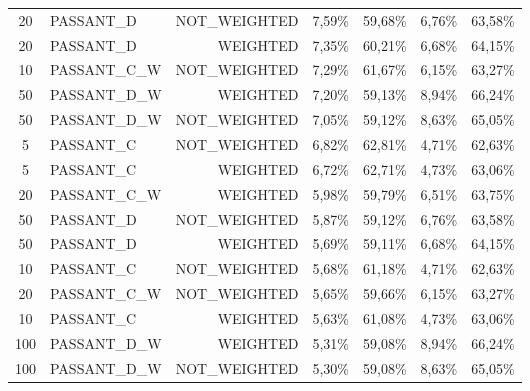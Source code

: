 \begin{table}[H]
{\begin{tabular}{ c l r c c c c }
			20 &  PASSANT\_D & NOT\_WEIGHTED &     7,59\% &    59,68\% &     6,76\% &    63,58\% \\
			
			20 &  PASSANT\_D &   WEIGHTED &     7,35\% &    60,21\% &     6,68\% &    64,15\% \\
			
			10 & PASSANT\_C\_W & NOT\_WEIGHTED &     7,29\% &    61,67\% &     6,15\% &    63,27\% \\
			
			50 & PASSANT\_D\_W &   WEIGHTED &     7,20\% &    59,13\% &     8,94\% &    66,24\% \\
			
			50 & PASSANT\_D\_W & NOT\_WEIGHTED &     7,05\% &    59,12\% &     8,63\% &    65,05\% \\
			
			5 &  PASSANT\_C & NOT\_WEIGHTED &     6,82\% &    62,81\% &     4,71\% &    62,63\% \\
			
			5 &  PASSANT\_C &   WEIGHTED &     6,72\% &    62,71\% &     4,73\% &    63,06\% \\
			
			20 & PASSANT\_C\_W &   WEIGHTED &     5,98\% &    59,79\% &     6,51\% &    63,75\% \\
			
			50 &  PASSANT\_D & NOT\_WEIGHTED &     5,87\% &    59,12\% &     6,76\% &    63,58\% \\
			
			50 &  PASSANT\_D &   WEIGHTED &     5,69\% &    59,11\% &     6,68\% &    64,15\% \\
			
			10 &  PASSANT\_C & NOT\_WEIGHTED &     5,68\% &    61,18\% &     4,71\% &    62,63\% \\
			
			20 & PASSANT\_C\_W & NOT\_WEIGHTED &     5,65\% &    59,66\% &     6,15\% &    63,27\% \\
			
			10 &  PASSANT\_C &   WEIGHTED &     5,63\% &    61,08\% &     4,73\% &    63,06\% \\
			
			100 & PASSANT\_D\_W &   WEIGHTED &     5,31\% &    59,08\% &     8,94\% &    66,24\% \\
			
			100 & PASSANT\_D\_W & NOT\_WEIGHTED &     5,30\% &    59,08\% &     8,63\% &    65,05\% \\
			

\end{tabular}}
\end{table}
